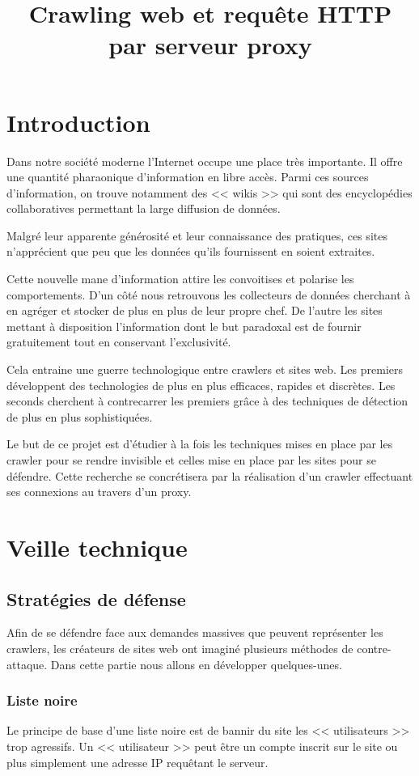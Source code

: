 \documentclass[hideweeklyreports,noposter]{polytech/polytech}
\title{Crawling web et requête HTTP par serveur proxy}
\begin{document}
\part{Introduction}
	Dans notre société moderne l'Internet occupe une place très importante.
	Il offre une quantité pharaonique d'information en libre accès.
	Parmi ces sources d'information, on trouve notamment des << wikis >> qui sont des encyclopédies collaboratives permettant la large diffusion de données.
	
	Malgré leur apparente générosité et leur connaissance des pratiques, ces sites n'apprécient que peu que les données qu'ils fournissent en soient extraites.
	
	Cette nouvelle mane d'information attire les convoitises et polarise les comportements.
	D'un côté nous retrouvons les collecteurs de données cherchant à en agréger et stocker de plus en plus de leur propre chef.
	De l'autre les sites mettant à disposition l'information dont le but paradoxal est de fournir gratuitement tout en conservant l'exclusivité.
	
	Cela entraine une guerre technologique entre crawlers et sites web.
	Les premiers développent des technologies de plus en plus efficaces, rapides et discrètes.
	Les seconds cherchent à contrecarrer les premiers grâce à des techniques de détection de plus en plus sophistiquées.

	Le but de ce projet est d'étudier à la fois les techniques mises en place par les crawler pour se rendre invisible et celles mise en place par les sites pour se défendre.
	Cette recherche se concrétisera par la réalisation d'un crawler effectuant ses connexions au travers d'un proxy.

	
\part{Veille technique}
	\chapter{Stratégies de défense}
		Afin de se défendre face aux demandes massives que peuvent représenter les crawlers, les créateurs de sites web ont imaginé plusieurs méthodes de contre-attaque.
		Dans cette partie nous allons en développer quelques-unes.
		
		\section{Liste noire\label{sec:liste_noire}}
			Le principe de base d'une liste noire est de bannir du site les << utilisateurs >> trop agressifs.
			Un << utilisateur >> peut être un compte inscrit sur le site ou plus simplement une adresse IP requêtant le serveur.	
			
\end{document}
